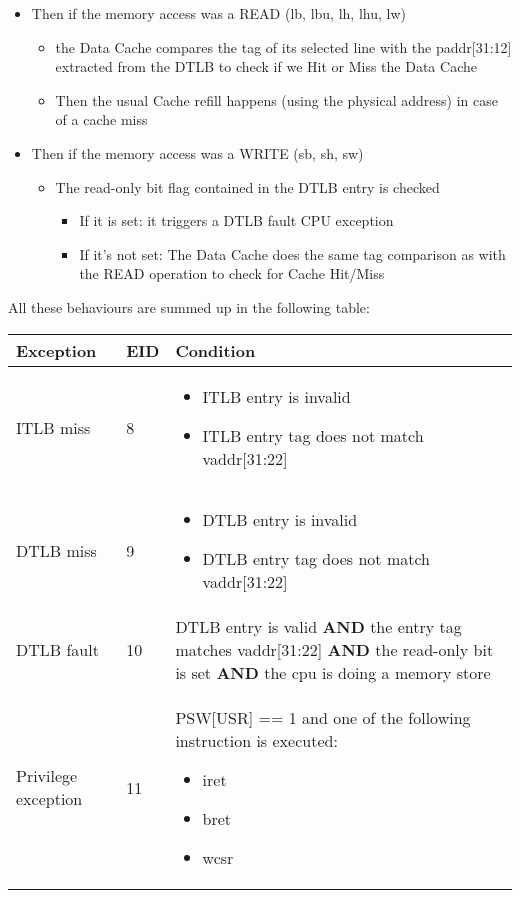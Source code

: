 \documentclass[a4paper,11pt]{article}
\begin{document}
\begin{itemize}
	\item Then if the memory access was a READ (lb, lbu, lh, lhu, lw)
	\begin{itemize}
		\item the Data Cache compares the tag of its selected line with the paddr[31:12] extracted from the DTLB to check if we Hit or Miss the Data Cache
		\item Then the usual Cache refill happens (using the physical address) in case of a cache miss
	\end{itemize}
	\item Then if the memory access was a WRITE (sb, sh, sw)
	\begin{itemize}
		\item The read-only bit flag contained in the DTLB entry is checked
		\begin{itemize}
			\item If it is set: it triggers a DTLB fault CPU exception
			\item If it's not set: The Data Cache does the same tag comparison as with the READ operation to check for Cache Hit/Miss
		\end{itemize}
	\end{itemize}
\end{itemize}

All these behaviours are summed up in the following table:
\newline

\begin{tabular}{|l l p{}|}
\hline
\bf{Exception} & \bf{EID} & \bf{Condition} \\
\hline
ITLB miss & 8 &
\parbox{0.5\textwidth}{
\begin{itemize}
	\item ITLB entry is invalid
	\item ITLB entry tag does not match vaddr[31:22]
\end{itemize} }
\\
\hline
DTLB miss & 9 &
\parbox{0.5\textwidth}{
\begin{itemize}
	\item DTLB entry is invalid
	\item DTLB entry tag does not match vaddr[31:22]
\end{itemize} }
\\
\hline
DTLB fault & 10 &
DTLB entry is valid \newline\textbf{AND} the entry tag matches vaddr[31:22] \newline\textbf{AND} the read-only bit is set \newline\textbf{AND} the cpu is doing a memory store
\\
\hline
Privilege exception & 11 &
\parbox{0.5\textwidth}{
PSW[USR] == 1 and one of the following instruction is executed:\newline
\begin{itemize}
	\item iret
	\item bret
	\item wcsr
\end{itemize}
}
\\
\hline
\end{tabular}
\end{document}
